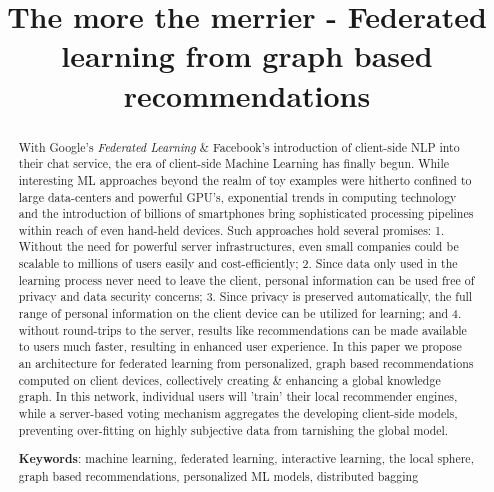 \documentclass{llncs}
\begin{document}
\title{The more the merrier - Federated learning from graph based recommendations}


	
\maketitle

\begin{abstract}
	
With Google's \textit{Federated Learning} \& Facebook's introduction of client-side NLP into their chat service, the era of client-side Machine Learning has finally begun. While interesting ML approaches beyond the realm of toy examples were hitherto confined to large data-centers and powerful GPU's, exponential trends in computing technology and the introduction of billions of smartphones bring sophisticated processing pipelines within reach of even hand-held devices. Such approaches hold several promises: 1. Without the need for powerful server infrastructures, even small companies could be scalable to millions of users easily and cost-efficiently; 2. Since data only used in the learning process never need to leave the client, personal information can be used free of privacy and data security concerns; 3. Since privacy is preserved automatically, the full range of personal information on the client device can be utilized for learning; and 4. without round-trips to the server, results like recommendations can be made available to users much faster, resulting in enhanced user experience. In this paper we propose an architecture for federated learning from personalized, graph based recommendations computed on client devices, collectively creating \& enhancing a global knowledge graph. In this network, individual users will 'train' their local recommender engines, while a server-based voting mechanism aggregates the developing client-side models, preventing over-fitting on highly subjective data from tarnishing the global model.

\medskip

\textbf{Keywords}: machine learning, federated learning, interactive learning, the local sphere, graph based recommendations, personalized ML models, distributed bagging


\end{abstract}
\end{document}
